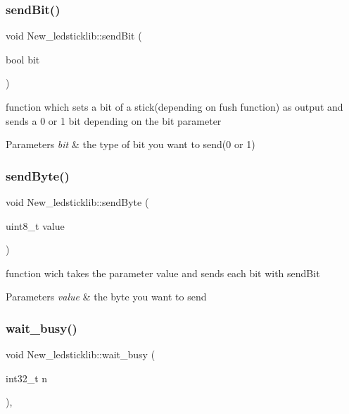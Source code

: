\subsubsection{\texorpdfstring{sendBit()}{sendBit()}}
{\footnotesize\ttfamily void New\+\_\+ledsticklib\+::send\+Bit (\begin{DoxyParamCaption}\item[{bool}]{bit }\end{DoxyParamCaption})\hspace{0.3cm}{\ttfamily [protected]}}



function which sets a bit of a stick(depending on fush function) as output and sends a 0 or 1 bit depending on the bit parameter 


\begin{DoxyParams}{Parameters}
{\em bit} & the type of bit you want to send(0 or 1) \\
\hline
\end{DoxyParams}
\mbox{\label{class_new__ledsticklib_a5c81be40c96d7fd3eaf6a4d7589b66dc}} 
\subsubsection{\texorpdfstring{sendByte()}{sendByte()}}
{\footnotesize\ttfamily void New\+\_\+ledsticklib\+::send\+Byte (\begin{DoxyParamCaption}\item[{uint8\+\_\+t}]{value }\end{DoxyParamCaption})\hspace{0.3cm}{\ttfamily [protected]}}



function wich takes the parameter value and sends each bit with send\+Bit 


\begin{DoxyParams}{Parameters}
{\em value} & the byte you want to send \\
\hline
\end{DoxyParams}
\mbox{\label{class_new__ledsticklib_a6f3fff3b20ff9371b01c9181842aee97}} 
\subsubsection{\texorpdfstring{wait\_busy()}{wait\_busy()}}
{\footnotesize\ttfamily void New\+\_\+ledsticklib\+::wait\+\_\+busy (\begin{DoxyParamCaption}\item[{int32\+\_\+t}]{n }\end{DoxyParamCaption})\hspace{0.3cm}{\ttfamily [static]}, {\ttfamily [protected]}}



